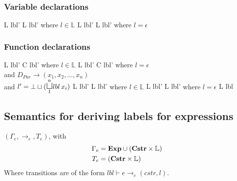 \subsubsection{Variable declarations}

\begin{trules}
        { {L} {lbl'} }
        { {L} {lbl'} }
        {where $l \in \mathbb{L}$}
        { {L} {lbl'} }
        { {L} {lbl'} }
        {where $l = \epsilon$}
\end{trules}

\subsubsection{Function declarations}

\begin{trules}
        { {L} {lbl'} }
        {
          { {C} {lbl'} }}
        {where $l \in \mathbb{L}$}
        { {L} {lbl'} }
        {
          { {C} {lbl'} }}
        {where $l = \epsilon$\\
        and $D_{Par} \rightarrow (x_1, x_2, \dots, x_n)$\\[0.25em]
        and $l' = \bot \sqcup (\mathlarger\sqcupl\limits_1^n lbl \, x_i)$}
        { {L} {lbl'} }
        { {L} {lbl'} }
        {where $l \in \mathbb{L}$}
        { {L} {lbl'} }
        { {L} {lbl'} }
        {where $l = \epsilon$}
        { {L} {lbl} }
        {}
\end{trules}

\subsection{Semantics for deriving labels for expressions}
$(\Gamma_e, \rightarrow_e, T_e)$, with
\begin{align*}
  \Gamma_e =  & \;      \mathbf{Exp} \cup (\mathbf{Cstr} \times \mathbb{L}) \\
  T_e =       & \; (\mathbf{Cstr} \times \mathbb{L})
\end{align*}
Where transitions are of the form $lbl \vdash e \rightarrow_e (cstr, l)$.

